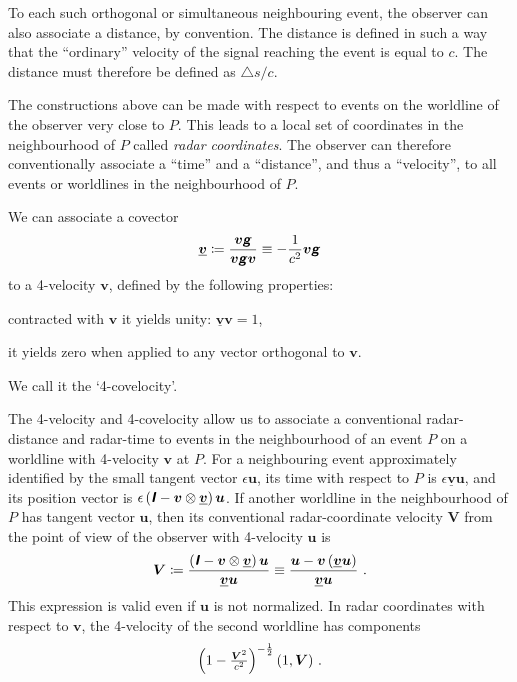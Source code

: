 \documentclass[\ifafour a4paper,12pt,\else a5paper,10pt,\fi%
onecolumn,oneside,article,%
british%
]{memoir}
\theoremstyle{remark}
\theoremstyle{innote}
\newcommand*{\mathte}[1]{\textbf{\textit{\textsf{#1}}}}
\newcommand*{\incr}{\triangle}%
\newcommand*{\defd}{\coloneqq}
\renewcommand*{\|}[1][]{\nonscript\:#1\vert\nonscript\:\mathopen{}}
\newcommand*{\id}{\mathte{I}}
\newcommand*{\yg}{\mathte{g}}
\newcommand*{\yv}{\bm{v}}
\newcommand*{\yvu}{\underline{\yv}}
\newcommand*{\yu}{\bm{u}}
\newcommand*{\yV}{\bm{V}}
\begin{document}
To each such orthogonal or simultaneous neighbouring event, the observer can also associate a distance, by convention. The distance is defined in such a way that the \enquote{ordinary} velocity of the signal reaching the event is equal to $c$. The distance must therefore be defined as $\incr s/c$.

The constructions above can be made with respect to events on the worldline of the observer very close to $P$. This leads to a local set of coordinates in the neighbourhood of $P$ called \emph{radar coordinates}. The observer can therefore conventionally associate a \enquote{time} and a \enquote{distance}, and thus a \enquote{velocity}, to all events or worldlines in the neighbourhood of $P$.

We can associate a covector
\begin{equation}
  \label{eq:co-4-velocity}
  \yvu \defd \frac{\yv\yg}{\yv\yg\yv} \equiv -\frac{1}{c^{2}} \yv\yg
\end{equation}
to a 4-velocity $\yv$, defined by the following properties:
\begin{enumerate*}[label=(\alph*)]
\item contracted with $\yv$ it yields unity: $\yvu\yv=1$,
\item it yields zero when applied to any vector orthogonal to $\yv$.
\end{enumerate*}
We call it the \enquote*{4-covelocity}.

The 4-velocity and 4-covelocity allow us to associate a conventional radar-distance and radar-time to events in the neighbourhood of an event $P$ on a worldline with 4-velocity $\yv$ at $P$. For a neighbouring event approximately identified by the small tangent vector $\epsilon\yu$, its time with respect to $P$ is $\epsilon\yvu\yu$, and its position vector is $\epsilon\,(\id - \yv\otimes\yvu)\,\yu$.
If another worldline in the neighbourhood of $P$ has tangent vector $\yu$, then its conventional radar-coordinate velocity $\yV$ from the point of view of the observer with 4-velocity $\yu$ is
\begin{equation}
  \label{eq:3-velocity}
\yV \defd  \frac{(\id - \yv\otimes\yvu)\,\yu}{\yvu\yu}
\equiv
  \frac{\yu - \yv\,(\yvu\yu)}{\yvu\yu}
  \ .
\end{equation}
This expression is valid even if $\yu$ is not normalized. In radar coordinates with respect to $\yv$, the 4-velocity of the second worldline has components
\begin{equation}
  \label{eq:components_4-vel}
  \Bigl(1-\tfrac{\yV^{2}}{c^{2}}\Bigr)^{-\frac12}\,
  (1, \yV) \ .
\end{equation}
\end{document}
